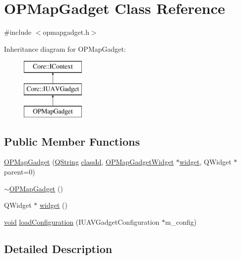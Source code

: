 \hypertarget{class_o_p_map_gadget}{\section{\-O\-P\-Map\-Gadget \-Class \-Reference}
\label{class_o_p_map_gadget}
}


{\ttfamily \#include $<$opmapgadget.\-h$>$}

\-Inheritance diagram for \-O\-P\-Map\-Gadget\-:\begin{figure}[H]
\begin{center}
\leavevmode
\includegraphics[height=3.000000cm]{class_o_p_map_gadget}
\end{center}
\end{figure}
\subsection*{\-Public \-Member \-Functions}
\begin{DoxyCompactItemize}
\item 
\hyperlink{group___o_p_map_plugin_ga6782261a51cde76c6b7fd104e0fc8607}{\-O\-P\-Map\-Gadget} (\hyperlink{group___u_a_v_objects_plugin_gab9d252f49c333c94a72f97ce3105a32d}{\-Q\-String} \hyperlink{group___core_plugin_ga3878fde66a57220608960bcc3fbeef2c}{class\-Id}, \hyperlink{class_o_p_map_gadget_widget}{\-O\-P\-Map\-Gadget\-Widget} $\ast$\hyperlink{group___o_p_map_plugin_ga4c0dd792243fff2dc45fd98929145d27}{widget}, \-Q\-Widget $\ast$parent=0)
\item 
\hyperlink{group___o_p_map_plugin_ga041e6faec573a7770cc9ddfdf8694a5e}{$\sim$\-O\-P\-Map\-Gadget} ()
\item 
\-Q\-Widget $\ast$ \hyperlink{group___o_p_map_plugin_ga4c0dd792243fff2dc45fd98929145d27}{widget} ()
\item 
\hyperlink{group___u_a_v_objects_plugin_ga444cf2ff3f0ecbe028adce838d373f5c}{void} \hyperlink{group___o_p_map_plugin_ga8a10d4d6d7feb8ab2c2dd928cc46c260}{load\-Configuration} (\-I\-U\-A\-V\-Gadget\-Configuration $\ast$m\-\_\-config)
\end{DoxyCompactItemize}


\subsection{\-Detailed \-Description}


